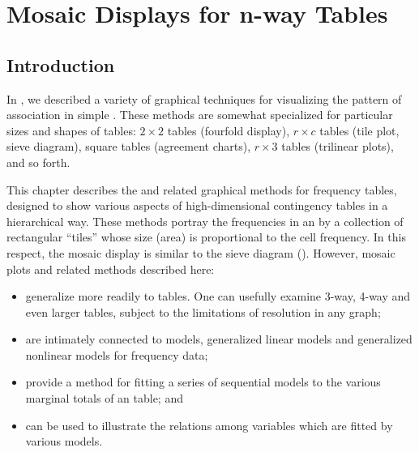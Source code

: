 \documentclass[10pt,krantz2]{krantz}\usepackage[]{graphicx}\usepackage[]{color}
\begin{document}


\chapter{Mosaic Displays for n-way Tables}\label{ch:mosaic}


\section{Introduction}\label{sec:mosaic-intro}


In , we described a variety of graphical techniques
for visualizing the pattern of association in simple \ctabs.
These methods are somewhat specialized for particular
sizes and shapes of tables:
$2 \times 2$ tables (fourfold display),
$r \times c$ tables (tile plot, sieve diagram),
square tables (agreement charts),
$r \times 3$ tables (trilinear plots), and so forth.

This chapter describes the
 and related graphical methods
for \nway frequency tables, designed to show
various aspects of high-dimensional contingency tables in a hierarchical way.
These methods portray the
frequencies in an \nway
\ctab  by a collection of rectangular ``tiles''
whose size (area) is proportional to the cell frequency.
In this respect, the mosaic display is similar to the sieve diagram ().
However, mosaic plots and related methods described here:
\begin{itemize}
\item generalize more readily to \nway tables.  One can usefully examine
3-way, 4-way and even larger tables, subject to the limitations
of resolution in any graph;
\item are intimately connected to \loglin models, generalized linear models
and generalized nonlinear models for frequency data;
\item provide a method for fitting a series of sequential \loglin
models to the various marginal totals of an \nway table; and
\item can be used to illustrate the relations among variables which
are fitted by various \loglin models.
\end{itemize}
\end{document}
